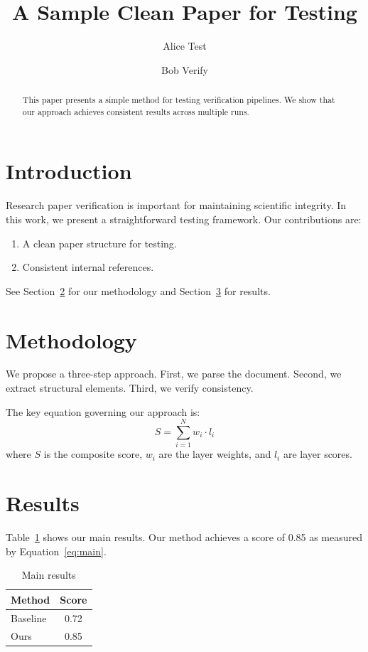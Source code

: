 \documentclass{article}
\title{A Sample Clean Paper for Testing}
\author{Alice Test \and Bob Verify}
\begin{document}
\maketitle

\begin{abstract}
This paper presents a simple method for testing verification pipelines.
We show that our approach achieves consistent results across multiple runs.
\end{abstract}

\section{Introduction}
\label{sec:intro}

Research paper verification is important for maintaining scientific integrity.
In this work, we present a straightforward testing framework.
Our contributions are:
\begin{enumerate}
\item A clean paper structure for testing.
\item Consistent internal references.
\end{enumerate}

See Section~\ref{sec:method} for our methodology and Section~\ref{sec:results} for results.

\section{Methodology}
\label{sec:method}

We propose a three-step approach. First, we parse the document.
Second, we extract structural elements. Third, we verify consistency.

The key equation governing our approach is:
\begin{equation}
\label{eq:main}
S = \sum_{i=1}^{N} w_i \cdot l_i
\end{equation}
where $S$ is the composite score, $w_i$ are the layer weights, and $l_i$ are layer scores.

\section{Results}
\label{sec:results}

Table~\ref{tab:results} shows our main results. Our method achieves a score of 0.85
as measured by Equation~\ref{eq:main}.

\begin{table}[h]
\centering
\caption{Main results}
\label{tab:results}
\begin{tabular}{lc}
\hline
Method & Score \\
\hline
Baseline & 0.72 \\
Ours & 0.85 \\
\hline
\end{tabular}
\end{table}
\end{document}
